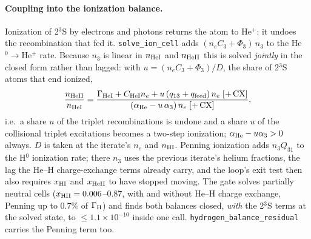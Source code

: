 \documentclass[english,a4paper]{my_memo}
\newcommand{\code}[1]{\texttt{#1}}
\begin{document}
\paragraph{Coupling into the ionization balance.}  Ionization of 2$^3$S by
electrons and photons returns the atom to He$^+$: it undoes the recombination
that fed it.  \code{solve\_ion\_cell} adds $(n_eC_3+\Phi_3)\,n_3$ to the
He$^0\rightarrow$He$^+$ rate.  Because $n_3$ is linear in $n_{\rm HeI}$ and
$n_{\rm HeII}$ this is solved \emph{jointly} in the closed form rather than
lagged: with $u = (n_eC_3+\Phi_3)/D$, the share of 2$^3$S atoms that end
ionized,
\begin{equation}
\frac{n_{\rm HeII}}{n_{\rm HeI}} =
 \frac{\Gamma_{\rm HeI} + C_{\rm HeI}n_e + u\,(q_{13}+q_{\rm feed})\,n_e\;[+\,{\rm CX}]}
      {(\alpha_{\rm He} - u\,\alpha_3)\,n_e\;[+\,{\rm CX}]},
\end{equation}
i.e.\ a share $u$ of the triplet recombinations is undone and a share $u$ of
the collisional triplet excitations becomes a two-step ionization;
$\alpha_{\rm He}-u\alpha_3>0$ always.  $D$ is taken at the iterate's $n_e$ and
$n_{\rm HI}$.  Penning ionization adds $n_3Q_{31}$ to the H$^0$ ionization
rate; there $n_3$ uses the previous iterate's helium fractions, the lag the
He--H charge-exchange terms already carry, and the loop's exit test then
also requires $x_{\rm HI}$ and $x_{\rm HeII}$ to have stopped moving.  The
gate solves partially neutral cells ($x_{\rm HII} = 0.006$--$0.87$, with and
without He--H charge exchange, Penning up to $0.7\%$ of $\Gamma_{\rm H}$) and
finds both balances closed, \emph{with} the 2$^3$S terms at the solved state,
to $\le1.1{\times}10^{-10}$ inside one call.
\code{hydrogen\_balance\_residual} carries the Penning term too.
\end{document}
